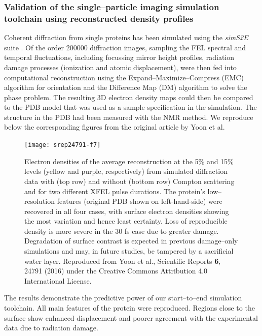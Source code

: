 \documentclass[10pt]{scrartcl}
\begin{document}
\subsubsection{Validation of the single--particle imaging simulation toolchain
using reconstructed density profiles}%
Coherent diffraction from single proteins has been simulated using the
\textit{simS2E} suite \cite{Yoon2016}. Of the order 200000 diffraction images,
sampling the FEL spectral and temporal fluctuations, including focussing
mirror height profiles, radiation damage processes (ionization and atomic
displacement), were then fed into computational reconstruction using the
Expand--Maximize--Compress (EMC) algorithm for orientation and the
Difference Map (DM) algorithm to solve the phase problem. The resulting 3D
electron density maps could then be compared to the PDB model that was used as
a sample specification in the simulation. The structure in the PDB had been
measured with the NMR method. We reproduce below the corresponding figures
from the original article by Yoon et al.
\begin{figure}[ht]
  \begin{center}
    \texttt{[image: srep24791-f7]}
  \end{center}
  \caption{Electron densities of the average reconstruction at the 5\% and 15\%
    levels (yellow and purple, respectively) from simulated diffraction data with
    (top row) and without (bottom row) Compton scattering and for two different
    XFEL pulse durations. The protein's low--resolution features (original PDB
    shown on left-hand-side) were recovered in
    all four cases, with surface electron densities showing the most variation and
    hence least certainty. Loss of reproducible density is more severe in the
    30 fs case due to greater damage. Degradation of surface contrast is
    expected in
    previous damage--only simulations and may, in future studies, be tampered by a
    sacrificial water layer\cite{Hau-Riege2004}. Reproduced
    from Yoon et al., Scientific Reports \textbf{6}, 24791 (2016) under the
  Creative Commons Attribution 4.0 International License.
}
  \label{fig:2NIP_reconstruction}
\end{figure}
The results demonstrate the predictive power of our start--to--end simulation
toolchain. All main features of the protein were reproduced. Regions close to
the surface show enhanced displacement and poorer agreement with the
experimental data due to radiation damage.
%
\end{document}
